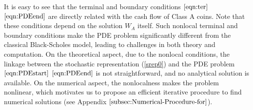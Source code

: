 \documentclass[draft, noinfoline]{ectaart}
\numberwithin{equation}{section}
\theoremstyle{plain}
\begin{document}
It is easy to see that the terminal and boundary conditions $\eqref{eqn:ter}$ \textendash{} $\eqref{eqn:PDEend}$ are directly related with the cash flow of Class A coins.
 Note that these conditions depend on the solution $W_{A}$ itself. Such nonlocal terminal and boundary conditions make the PDE problem significantly different from the classical Black-Scholes model, leading to challenges in both theory and computation. On the theoretical aspect, due to the nonlocal conditions, the linkage between the stochastic representation (\ref{srep0}) and the PDE problem $\eqref{eqn:PDEstart}$ \textendash{} $\eqref{eqn:PDEend}$ is not straightforward, and no analytical solution is available. On the numerical aspect, the nonlocalness makes the problem nonlinear, which motivates us to propose an efficient iterative procedure to find numerical solutions (see Appendix $\ref{subsec:Numerical-Procedure-for}$).
\end{document}
